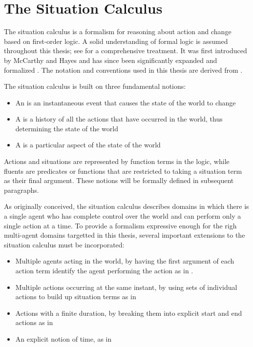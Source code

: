 \section{The Situation Calculus}

The situation calculus is a formalism for reasoning about action and change 
based on first-order logic. A solid understanding of formal logic 
is assumed throughout this thesis;  see \cite{fitting96fol_book} for a 
comprehensive treatment.  It was first introduced by McCarthy and Hayes 
\cite{McCHay69sitcalc} and has since been significantly expanded and formalized 
\cite{reiter91frameprob,pirri99contributions_sitcalc,levesque98sc_foundations}.
The notation and conventions used in this thesis are derived from 
\cite{levesque98sc_foundations}.

The situation calculus is built on three fundamental notions:
\begin{itemize}
 \item An  is an instantaneous event that causes the state of
       the world to change
 \item A  is a history of all the actions that have occurred
       in the world, thus determining the state of the world
 \item A  is a particular aspect of the state of the world
\end{itemize}

Actions and situations are represented by function terms in the logic,
while fluents are predicates or functions that are restricted to taking
a situation term as their final argument.  These notions will be formally
defined in subsequent paragraphs.

As originally conceived, the situation calculus describes domains in which 
there is a single agent who has complete control over the world and can
perform only a single action at a time.  To provide a formalism expressive
enough for the righ multi-agent domains targetted in this thesis, several 
important extensions to the situation calculus must be incorporated:
\begin{itemize}
 \item Multiple agents acting in the world, by having the first argument of each       action term identify the agent performing the action as in \cite{shapiro98specifying_ma_systems,shapiro01casl_feat_inter}.
 \item Multiple actions occurring at the same instant, by using sets of individual actions to build up situation terms as in \cite{lin92sc_conc,pinto94temporal,reiter96sc_nat_conc}
 \item Actions with  a finite duration, by breaking them into explicit start and end actions as in \cite{pinto94temporal}
 \item An explicit notion of time, as in \cite{pinto94temporal,reiter96sc_nat_conc}
\end{itemize}

